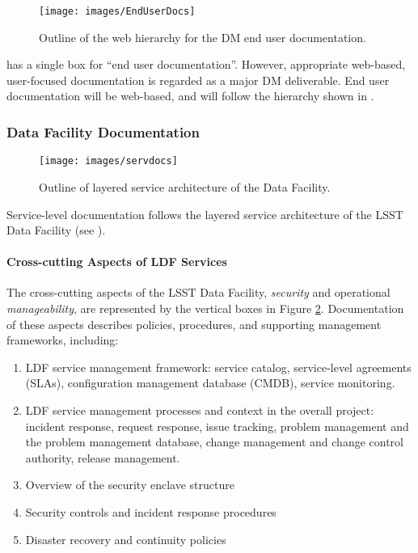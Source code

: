 \begin{figure}
\begin{center}
 \texttt{[image: images/EndUserDocs]}
\caption{Outline of the web hierarchy for the DM end user documentation. \label{fig:eudoc}}
\end{center}
\end{figure}

 has a single box for ``end user documentation''. However, appropriate web-based, user-focused documentation is regarded as a major DM deliverable.
End user documentation will be web-based, and will follow the hierarchy shown in .

\subsubsection{Data Facility Documentation}

\begin{figure}
\begin{center}
 \texttt{[image: images/servdocs]}
\caption{Outline of layered service architecture of the Data Facility. \label{fig:servdoc}}
\end{center}
\end{figure}

Service-level documentation follows the layered service architecture of the LSST Data Facility (see ).

\paragraph{Cross-cutting Aspects of LDF Services}

The cross-cutting aspects of the LSST Data Facility, \textit{security} and operational \textit{manageability}, are represented by the vertical boxes in Figure \ref{fig:servdoc}.
Documentation of these aspects describes policies, procedures, and supporting management frameworks, including:

\begin{enumerate}
	\item	LDF service management framework: service catalog, service-level agreements (SLAs), configuration management database (CMDB), service monitoring.
	\item	LDF service management processes and context in the overall project: incident response, request response, issue tracking, problem management and the problem management database, change management and change control authority, release management.
	\item	Overview of the security enclave structure
	\item	Security controls and incident response procedures
	\item	Disaster recovery and continuity policies
\end{enumerate}

